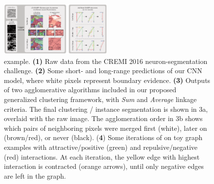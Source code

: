 
\begin{figure}[t]
\centering
\includegraphics[width=0.5\textwidth]{figs/intro_image_v4.pdf} %
\caption{\algname{} example. \textbf{(1)} Raw data from the CREMI 2016 neuron-segmentation challenge. \textbf{(2)} Some short- and long-range predictions of our CNN model, where white pixels represent boundary evidence. \textbf{(3)} Outputs of two agglomerative algorithms included in our proposed generalized clustering framework, with \emph{Sum} and \emph{Average} linkage criteria. The final clustering / instance segmentation is shown in 3a, overlaid with the raw image.  The  agglomeration order in 3b shows which pairs of neighboring pixels were merged first (white), later on (brown/red), or never (black). (\textbf{4}) Some iterations of \algname{} on toy graph examples with attractive/positive (green) and repulsive/negative (red) interactions. At each iteration, the yellow edge with highest interaction is contracted (orange arrows), until only negative edges are left in the graph. 
\label{fig:intro_figure}}
\end{figure}

